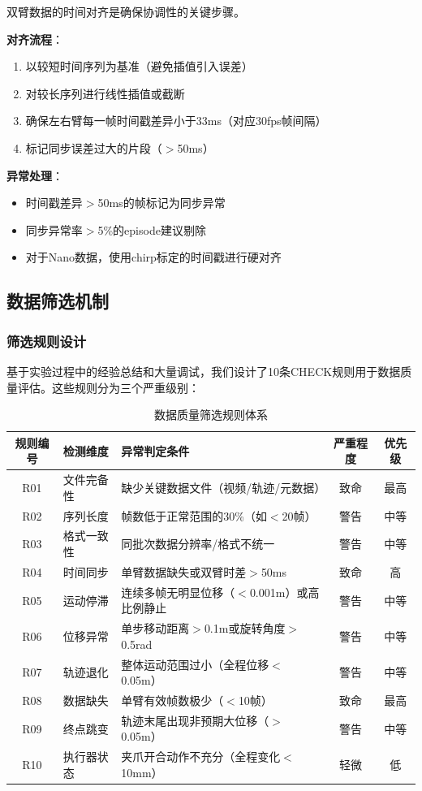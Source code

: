 双臂数据的时间对齐是确保协调性的关键步骤。

\textbf{对齐流程}：
\begin{enumerate}[leftmargin=2em]
    \item 以较短时间序列为基准（避免插值引入误差）
    \item 对较长序列进行线性插值或截断
    \item 确保左右臂每一帧时间戳差异小于33ms（对应30fps帧间隔）
    \item 标记同步误差过大的片段（$>$50ms）
\end{enumerate}

\textbf{异常处理}：
\begin{itemize}[leftmargin=2em]
    \item 时间戳差异$>$50ms的帧标记为同步异常
    \item 同步异常率$>$5\%的episode建议剔除
    \item 对于Nano数据，使用chirp标定的时间戳进行硬对齐
\end{itemize}

\subsection{数据筛选机制}

\subsubsection{筛选规则设计}

基于实验过程中的经验总结和大量调试，我们设计了10条CHECK规则用于数据质量评估。这些规则分为三个严重级别：

\begin{table}[htbp]
\centering
\caption{数据质量筛选规则体系}
\label{tab:check_rules}
\begin{tabular}{clp{5.5cm}cc}
\toprule
规则编号 & 检测维度 & 异常判定条件 & 严重程度 & 优先级 \\
\midrule
R01 & 文件完备性 & 缺少关键数据文件（视频/轨迹/元数据） & 致命 & 最高 \\
R02 & 序列长度 & 帧数低于正常范围的30\%（如$<$20帧） & 警告 & 中等 \\
R03 & 格式一致性 & 同批次数据分辨率/格式不统一 & 警告 & 中等 \\
R04 & 时间同步 & 单臂数据缺失或双臂时差$>$50ms & 致命 & 高 \\
R05 & 运动停滞 & 连续多帧无明显位移（$<$0.001m）或高比例静止 & 警告 & 中等 \\
R06 & 位移异常 & 单步移动距离$>$0.1m或旋转角度$>$0.5rad & 警告 & 中等 \\
R07 & 轨迹退化 & 整体运动范围过小（全程位移$<$0.05m） & 警告 & 中等 \\
R08 & 数据缺失 & 单臂有效帧数极少（$<$10帧） & 致命 & 最高 \\
R09 & 终点跳变 & 轨迹末尾出现非预期大位移（$>$0.05m） & 警告 & 中等 \\
R10 & 执行器状态 & 夹爪开合动作不充分（全程变化$<$10mm） & 轻微 & 低 \\
\bottomrule
\end{tabular}
\end{table}

